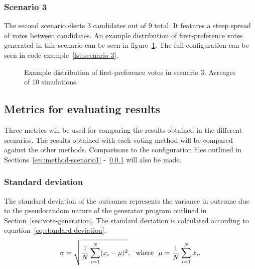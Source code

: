 \documentclass[12pt]{article}
\begin{document}
\subsubsection{Scenario 3}
\label{sec:method-scenario3}
The second scenario elects 3 candidates out of 9 total. It features a steep spread of votes between candidates. An example distribution of first-preference votes generated in this scenario can be seen in figure~\ref{fig:example of scenario 3}. The full configuration can be seen in code example~\ref{lst:scenario 3}.
\begin{figure}[H]
	\centering
	\caption{Example distribution of first-preference votes in scenario 3. Avreages of 10 simulations.}
\label{fig:example of scenario 3}
\end{figure}
\subsection{Metrics for evaluating results}
Three metrics will be used for comparing the results obtained in the different scenarios. The results obtained with each voting method will be compared against the other methods. Comparisons to the configuration files outlined in Sections~\ref{sec:method-scenario1} -~\ref{sec:method-scenario3} will also be made.
\subsubsection{Standard deviation}
The standard deviation of the outcomes represents the variance in outcome due to the pseudorandom nature of the generator program outlined in Section~\ref{sec:vote-generation}. The standard deviation is calculated according to equation~\ref{eq:standard-deviation}. 
\begin{equation}
	\label{eq:standard-deviation}
	\sigma ={\sqrt {{\frac {1}{N}}\sum _{i=1}^{N}(x_{i}-\mu )^{2}}},{\rm {\ \ where\ \ }}\mu ={\frac {1}{N}}\sum _{i=1}^{N}x_{i}.
\end{equation}
\end{document}
